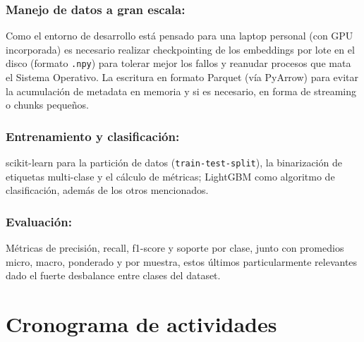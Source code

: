 \documentclass[12pt, a4paper]{article}
\begin{document}
\subsubsection{Manejo de datos a gran escala:} Como el entorno de desarrollo está pensado para una laptop personal (con GPU incorporada) es necesario realizar checkpointing de los embeddings por lote en el disco (formato \texttt{.npy}) para tolerar mejor los fallos y reanudar procesos que mata el Sistema Operativo. La escritura en formato Parquet (vía PyArrow) para evitar la acumulación de metadata en memoria y si es necesario, en forma de streaming o chunks pequeños.

\subsubsection{Entrenamiento y clasificación:} scikit-learn para la partición de datos (\texttt{train-test-split}), la binarización de etiquetas multi-clase y el cálculo de métricas; LightGBM como algoritmo de clasificación, además de los otros mencionados.

\subsubsection{Evaluación:} Métricas de precisión, recall, f1-score y soporte por clase, junto con promedios micro, macro, ponderado y por muestra, estos últimos particularmente relevantes dado el fuerte desbalance entre clases del dataset.


\section{Cronograma de actividades}
\end{document}
